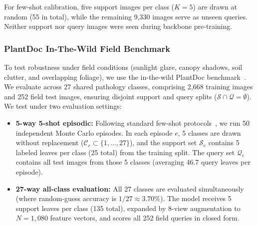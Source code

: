 \documentclass[preprint,12pt]{elsarticle}
\begin{document}
For few-shot calibration, five support images per class ($K=5$) are drawn at random (55 in total), while the remaining 9,330 images serve as unseen queries. Neither support nor query images were seen during backbone pre-training.

\subsubsection{PlantDoc In-The-Wild Field Benchmark}
To test robustness under field conditions (sunlight glare, canopy shadows, soil clutter, and overlapping foliage), we use the in-the-wild PlantDoc benchmark~\cite{singh2020plantdoc}. We evaluate across 27 shared pathology classes, comprising 2{,}668 training images and 252 field test images, ensuring disjoint support and query splits ($\mathcal{S} \cap \mathcal{Q} = \emptyset$). We test under two evaluation settings:
\begin{itemize}
    \item \textbf{5-way 5-shot episodic:} Following standard few-shot protocols~\cite{snell2017prototypical,zhou2026vsf}, we run 50 independent Monte Carlo episodes. In each episode $e$, 5 classes are drawn without replacement ($\mathcal{C}_e \subset \{1, \dots, 27\}$), and the support set $\mathcal{S}_e$ contains 5 labeled leaves per class (25 total) from the training split. The query set $\mathcal{Q}_e$ contains all test images from those 5 classes (averaging 46.7 query leaves per episode).
    \item \textbf{27-way all-class evaluation:} All 27 classes are evaluated simultaneously (where random-guess accuracy is $1/27 \approx 3.70\%$). The model receives 5 support leaves per class (135 total), expanded by 8-view augmentation to $N = 1{,}080$ feature vectors, and scores all 252 field queries in closed form.
\end{itemize}
\end{document}
